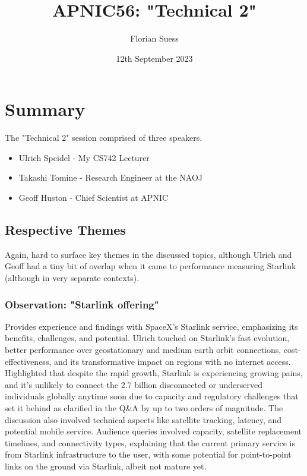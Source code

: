 \documentclass[twocolumn]{article}
\title{APNIC56: "Technical 2"}
\date{12th September 2023}
\author{Florian Suess}
\begin{document}
\maketitle

\section*{Summary}
The "Technical 2" session comprised of three speakers.

\begin{itemize}
				\item Ulrich Speidel - My CS742 Lecturer 
				\item Takashi Tomine - Research Engineer at the NAOJ 
				\item Geoff Huston - Chief Scientist at APNIC
\end{itemize}

\subsection*{Respective Themes}
Again, hard to surface key themes in the discussed topics, although Ulrich and Geoff had a tiny bit of overlap when it came to performance measuring Starlink (although in very separate contexts).

\subsubsection*{Observation: "Starlink offering"}
Provides experience and findings with SpaceX's Starlink service, emphasizing its benefits, challenges, and potential. Ulrich touched on Starlink's fast evolution, better performance over geostationary and medium earth orbit connections, cost-effectiveness, and its transformative impact on regions with no internet access. Highlighted that despite the rapid growth, Starlink is experiencing growing pains, and it's unlikely to connect the 2.7 billion disconnected or underserved individuals globally anytime soon due to capacity and regulatory challenges that set it behind as clarified in the Q\&A by up to two orders of magnitude. The discussion also involved technical aspects like satellite tracking, latency, and potential mobile service. Audience queries involved capacity, satellite replacement timelines, and connectivity types, explaining that the current primary service is from Starlink infrastructure to the user, with some potential for point-to-point links on the ground via Starlink, albeit not mature yet.
\end{document}
